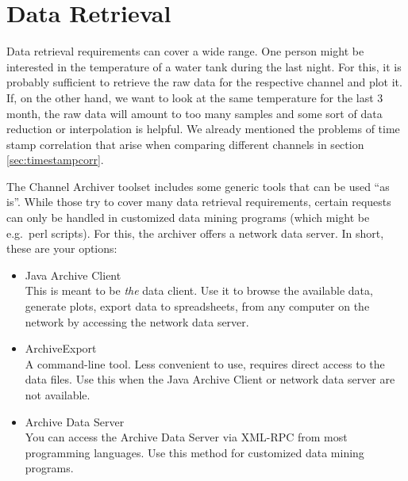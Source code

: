 \chapter{Data Retrieval}  \label{chap:retrieval}
Data retrieval requirements can cover a wide range.  One person might
be interested in the temperature of a water tank during the last
night. For this, it is probably sufficient to retrieve the raw data
for the respective channel and plot it.  If, on the other hand, we
want to look at the same temperature for the last 3 month, the raw
data will amount to too many samples and some sort of data reduction
or interpolation is helpful.  We already mentioned the problems of
time stamp correlation that arise when comparing different channels in
section \ref{sec:timestampcorr}.

The Channel Archiver toolset includes some generic tools that can be
used ``as is''. While those try to cover many data retrieval
requirements, certain requests can only be handled in customized data
mining programs (which might be e.g.\ perl scripts). For this, the
archiver offers a network data server. In short, these are your
options:

\begin{itemize}
\item Java Archive Client\\
      This is meant to be \emph{the} data client. Use it to browse the
      available data, generate plots, export data to spreadsheets,
      from any computer on the network by accessing the network data server.
\item ArchiveExport\\
      A command-line tool. Less convenient to use, requires direct
      access to the data files. Use this when the Java Archive Client
      or network data server are not available.
\item Archive Data Server\\
      You can access the Archive Data Server via XML-RPC from most
      programming languages. Use this method for customized data
      mining programs.
\end{itemize}